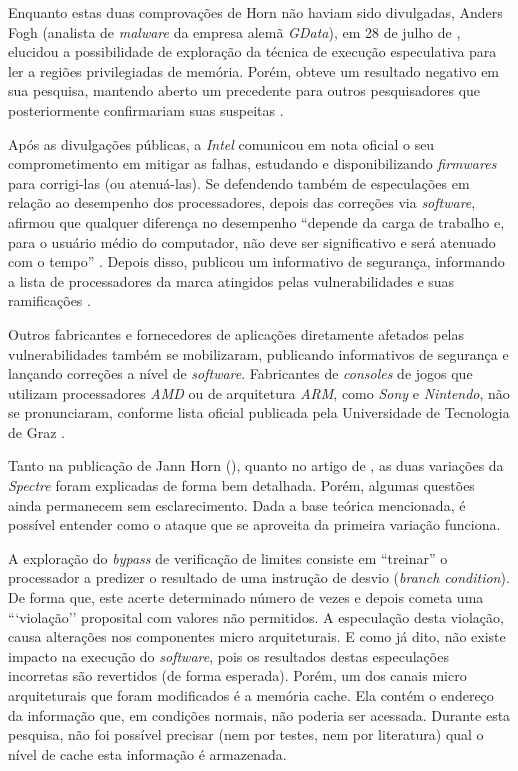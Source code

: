 \documentclass[
	article,			    %
	12pt,				    %
	oneside,			    %
	a4paper,			    %
	chapter=TITLE,		    %
	section=TITLE,		    %
	subsection=TITLE,	    %
	english,			    %
	brazil,				    %
	sumario=tradicional
]{abntex2}
\begin{document}
Enquanto estas duas comprovações de Horn não haviam sido divulgadas, Anders Fogh (analista de \emph{malware} da empresa alemã \emph{GData}), em 28 de julho de \citeyear{Anders2017Reading}, elucidou a possibilidade de exploração da técnica de execução especulativa para ler a regiões privilegiadas de memória. Porém, obteve um resultado negativo em sua pesquisa, mantendo aberto um precedente para outros pesquisadores que posteriormente confirmariam suas suspeitas \cite{Andy2018Triple}.

Após as divulgações públicas, a \emph{Intel} comunicou em nota oficial o seu comprometimento em mitigar as falhas, estudando e disponibilizando \emph{firmwares} para corrigi-las (ou atenuá-las). Se defendendo também de especulações em relação ao desempenho dos processadores, depois das correções via \emph{software}, afirmou que qualquer diferença no desempenho ``depende da carga de trabalho e, para o usuário médio do computador, não deve ser significativo e será atenuado com o tempo'' \cite{Intel2018NewsIssues}. Depois disso, publicou um informativo de segurança, informando a lista de processadores da marca atingidos pelas vulnerabilidades e suas ramificações \cite{Intel2018SA00088}.

Outros fabricantes e fornecedores de aplicações diretamente afetados pelas vulnerabilidades também se mobilizaram, publicando informativos de segurança e lançando correções a nível de \emph{software}. Fabricantes de \emph{consoles} de jogos que utilizam processadores \emph{AMD} ou de arquitetura \emph{ARM}, como \emph{Sony} e \emph{Nintendo}, não se pronunciaram, conforme lista oficial publicada pela Universidade de Tecnologia de Graz \cite{Graz2018Meltdown}.

Tanto na publicação de Jann Horn (\citeyear{Jann2018Reading}), quanto no artigo de , as duas variações da \emph{Spectre} foram explicadas de forma bem detalhada. Porém, algumas questões ainda permanecem sem esclarecimento. Dada a base teórica mencionada, é possível entender como o ataque que se aproveita da primeira variação funciona.

A exploração do \emph{bypass} de verificação de limites consiste em “treinar” o processador a predizer o resultado de uma instrução de desvio (\emph{branch condition}). De forma que, este acerte determinado número de vezes e depois cometa uma ```violação'' proposital com valores não permitidos. A especulação desta violação, causa alterações nos componentes micro arquiteturais. E como já dito, não existe impacto na execução do \emph{software}, pois os resultados destas especulações incorretas são revertidos (de forma esperada). Porém, um dos canais micro arquiteturais que foram modificados é a memória cache. Ela contém o endereço da informação que, em condições normais, não poderia ser acessada. Durante esta pesquisa, não foi possível precisar (nem por testes, nem por literatura) qual o nível de cache esta informação é armazenada.
\end{document}
